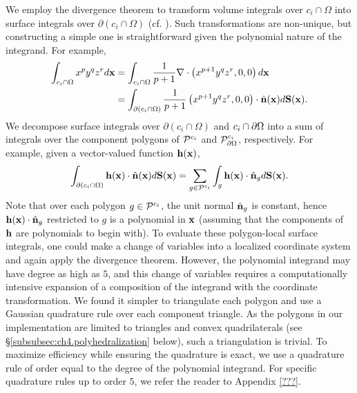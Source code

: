 We employ the divergence theorem to transform volume integrals over $c_i \cap \Omega$ into surface integrals over $\partial(c_i \cap \Omega)$ (cf. \cite{Min.Chohong07}). Such transformations are non-unique, but constructing a simple one is straightforward given the polynomial nature of the integrand. For example,
\begin{align*}
\int_{c_i \cap \Omega} x^p y^q z^r d\mathbf{x}
& = \int_{c_i \cap \Omega} \frac{1}{p+1} \nabla \cdot \left( x^{p+1} y^q z^r, 0, 0 \right) d\mathbf{x} \\
& = \int_{\partial(c_i \cap \Omega)} \frac{1}{p+1} \left( x^{p+1} y^q z^r, 0, 0 \right) \cdot \hat{\mathbf{n}}(\mathbf{x}) d\mathbf{S}(\mathbf{x}).
\end{align*}
We decompose surface integrals over $\partial(c_i \cap \Omega)$ and $c_i \cap \partial\Omega$ into a sum of integrals over the component polygons of $\mathcal{P}^{c_i}$ and $\mathcal{P}_{\partial\Omega}^{c_i}$, respectively. For example, given a vector-valued function $\mathbf{h}(\mathbf{x})$,
\begin{equation*}
\int_{\partial(c_i \cap \Omega)} \mathbf{h}(\mathbf{x}) \cdot \hat{\mathbf{n}}(\mathbf{x}) d\mathbf{S}(\mathbf{x}) = \sum_{g \in \mathcal{P}^{c_i}} \int_g \mathbf{h}(\mathbf{x}) \cdot \hat{\mathbf{n}}_g d\mathbf{S}(\mathbf{x}).
\end{equation*}
Note that over each polygon $g \in \mathcal{P}^{c_i}$, the unit normal $\hat{\mathbf{n}}_g$ is constant, hence $\mathbf{h}(\mathbf{x}) \cdot \hat{\mathbf{n}}_g$ restricted to $g$ is a polynomial in $\mathbf{x}$ (assuming that the components of $\mathbf{h}$ are polynomials to begin with). To evaluate these polygon-local surface integrals, one could make a change of variables into a localized coordinate system and again apply the divergence theorem. However, the polynomial integrand may have degree as high as $5$, and this change of variables requires a computationally intensive expansion of a composition of the integrand with the coordinate transformation. We found it simpler to triangulate each polygon and use a Gaussian quadrature rule over each component triangle. As the polygons in our implementation are limited to triangles and convex quadrilaterals (see \S\ref{subsubsec:ch4.polyhedralization} below), such a triangulation is trivial. To maximize efficiency while ensuring the quadrature is exact, we use a quadrature rule of order equal to the degree of the polynomial integrand. For specific quadrature rules up to order $5$, we refer the reader to Appendix \ref{???}.

